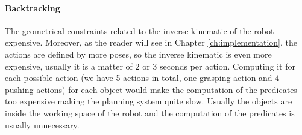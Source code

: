 
	
\paragraph{Backtracking}

The geometrical constraints related to the inverse kinematic of the robot  expensive. Moreover, as the reader will see in Chapter \ref{ch:implementation}, the actions are defined by more poses, so the inverse kinematic is even more expensive, usually it is a matter of $2$ or $3$ seconds per action. Computing it for each possible action (we have 5 actions in total, one grasping action and 4 pushing actions) for each object would make the computation of the predicates too expensive making the planning system quite slow. Usually the objects are inside the working space of the robot and the computation of the  predicates is usually unnecessary.

